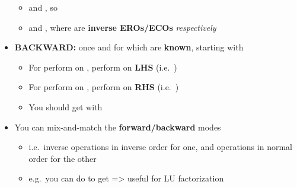 \begin{itemize}
        \begin{itemize}

          \item
                 and
                , so
          \item
                 and
                , where
                 are \textbf{inverse EROs/ECOs}
                \emph{respectively}
        \end{itemize}
  \item
        \textbf{BACKWARD:} once  and
         for which  are
        \textbf{known}, starting with \iMbox{[I_{m} \ | \ A \ | \ I_{n}]}

        \begin{itemize}

          \item
                For  perform  on
                , perform  on \textbf{LHS}
                (i.e.~)
          \item
                For  perform  on ,
                perform  on \textbf{RHS}
                (i.e.~)
          \item
                You should get
                \iMbox{\ds [I_{m} \ | \ A \ | \ I_{n}] \rightsquigarrow [R^{-1} \ | \ A' \ | \ C^{-1}]}
                with 
        \end{itemize}
  \item
        You can mix-and-match the \textbf{forward/backward} modes

        \begin{itemize}

          \item
                i.e.~inverse operations in inverse order for one, and operations in
                normal order for the other
          \item
                e.g.~you can do
                \iMbox{\ds [I_{m} \ | \ A \ | \ I_{n}] \rightsquigarrow [R^{-1} \ | \ A' \ | \ C]}
                to get  =\textgreater{} useful for LU
                factorization
        \end{itemize}
\end{itemize}

